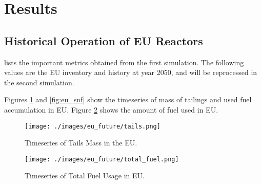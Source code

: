 \section{Results}

\subsection{Historical Operation of \gls{EU} Reactors}

\begin{table}[h]
\centering
{}
\caption{Simulation Results for Historical Nuclear Operation of \gls{EU} Nations}
\label{tab:sim_result}
\end {table}

 lists the important metrics
obtained from the first simulation. The following
values are the \gls{EU} inventory and history at year 2050,
and will be reprocessed in the second simulation.

Figures \ref{fig:eu_tail} and \ref{fig:eu_snf} show the 
timeseries of mass of tailings and used fuel accumulation in \gls{EU}.
Figure \ref{fig:eu_fuel} shows the amount of fuel used in \gls{EU}.


\begin{figure}[htbp!]
	\begin{center}
		\texttt{[image: ./images/eu\_future/tails.png]}
	\end{center}
	\caption{Timeseries of Tails Mass in the \gls{EU}.}
	\label{fig:eu_tail}
\end{figure}

\begin{figure}[htbp!]
	\begin{center}
		\texttt{[image: ./images/eu\_future/total\_fuel.png]}
	\end{center}
	\caption{Timeseries of Total Fuel Usage in \gls{EU}.}
	\label{fig:eu_fuel}
\end{figure}

